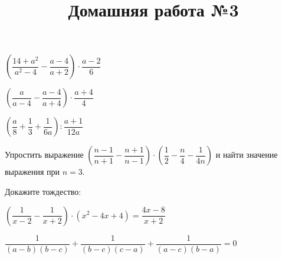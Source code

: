 \begin{listofex}
\begin{enumcols}[itemcolumns=2]
		\item \( \left( \dfrac{14+a^2}{a^2-4}-\dfrac{a-4}{a+2} \right)\cdot\dfrac{a-2}{6} \)
		\item \( \left( \dfrac{a}{a-4}-\dfrac{a-4}{a+4} \right)\cdot\dfrac{a+4}{4} \)
		\item \( \left( \dfrac{a}{8}+\dfrac{1}{3}+\dfrac{1}{6a} \right):\dfrac{a+1}{12a} \)
	\end{enumcols}
	\item Упростить выражение \( \left( \dfrac{n-1}{n+1}-\dfrac{n+1}{n-1} \right)\cdot\left( \dfrac{1}{2}-\dfrac{n}{4}-\dfrac{1}{4n} \right) \) и найти значение выражения при \( n=3 \).
	\item Докажите тождество:
	\begin{enumcols}[itemcolumns=1]
		\item \( \left( \dfrac{1}{x-2}-\dfrac{1}{x+2} \right)\cdot(x^2-4x+4)=\dfrac{4x-8}{x+2} \)
		\item \( \dfrac{1}{(a-b)(b-c)}+\dfrac{1}{(b-c)(c-a)}+\dfrac{1}{(a-c)(b-a)}=0 \)
	\end{enumcols}
\end{listofex}
\newpage
\title{Домашняя работа №3}
